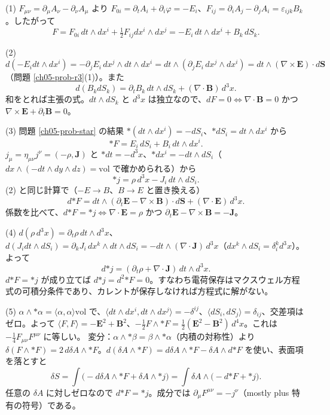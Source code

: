 \begin{solution}
(1) $F_{\mu\nu}=\partial_\mu A_\nu-\partial_\nu A_\mu$ より $F_{0i}=\partial_tA_i+\partial_i\varphi=-E_i$、$F_{ij}=\partial_iA_j-\partial_jA_i=\varepsilon_{ijk}B_k$。したがって
\[
F=F_{0i}\,dt\wedge dx^i+\tfrac12F_{ij}dx^i\wedge dx^j=-E_i\,dt\wedge dx^i+B_k\,dS_k .
\]

(2) $d(-E_idt\wedge dx^i)=-\partial_jE_i\,dx^j\wedge dt\wedge dx^i=dt\wedge(\partial_jE_i\,dx^j\wedge dx^i)=dt\wedge(\nabla\times\bm E)\cdot d\bm S$（問題 \ref{ch05-prob-r3}(1)）。また
\[
d(B_kdS_k)=\partial_tB_k\,dt\wedge dS_k+(\nabla\cdot\bm B)\,d^3x .
\]
和をとれば主張の式。$dt\wedge dS_k$ と $d^3x$ は独立なので、$dF=0\iff\nabla\cdot\bm B=0$ かつ $\nabla\times\bm E+\partial_t\bm B=0$。

(3) 問題 \ref{ch05-prob-star} の結果 ${*}(dt\wedge dx^i)=-dS_i$、${*}dS_i=dt\wedge dx^i$ から
\[
{*F}=E_i\,dS_i+B_i\,dt\wedge dx^i .
\]
$j_\mu=\eta_{\mu\nu}j^\nu=(-\rho,\bm J)$ と ${*dt}=-d^3x$、${*}dx^i=-dt\wedge dS_i$（$dx\wedge(-dt\wedge dy\wedge dz)=\mathrm{vol}$ で確かめられる）から
\[
{*j}=\rho\,d^3x-J_i\,dt\wedge dS_i .
\]
(2) と同じ計算で（$-E\to B$、$B\to E$ と置き換える）
\[
d{*F}=dt\wedge(\partial_t\bm E-\nabla\times\bm B)\cdot d\bm S+(\nabla\cdot\bm E)\,d^3x .
\]
係数を比べて、$d{*F}={*j}\iff\nabla\cdot\bm E=\rho$ かつ $\partial_t\bm E-\nabla\times\bm B=-\bm J$。

(4) $d(\rho\,d^3x)=\partial_t\rho\,dt\wedge d^3x$、$d(J_idt\wedge dS_i)=\partial_kJ_i\,dx^k\wedge dt\wedge dS_i=-dt\wedge(\nabla\cdot\bm J)\,d^3x$（$dx^k\wedge dS_i=\delta^k_id^3x$）。よって
\[
d{*j}=(\partial_t\rho+\nabla\cdot\bm J)\,dt\wedge d^3x .
\]
$d{*F}={*j}$ が成り立てば $d{*j}=d^2{*F}=0$。すなわち電荷保存はマクスウェル方程式の可積分条件であり、カレントが保存しなければ方程式に解がない。

(5) $\alpha\wedge{*\alpha}=\langle\alpha,\alpha\rangle\mathrm{vol}$ で、$\langle dt\wedge dx^i,dt\wedge dx^j\rangle=-\delta^{ij}$、$\langle dS_i,dS_j\rangle=\delta_{ij}$、交差項はゼロ。よって $\langle F,F\rangle=-\bm E^2+\bm B^2$、$-\frac12F\wedge{*F}=\frac12(\bm E^2-\bm B^2)\,d^4x$。これは $-\frac14F_{\mu\nu}F^{\mu\nu}$ に等しい。
変分：$\alpha\wedge{*\beta}=\beta\wedge{*\alpha}$（内積の対称性）より $\delta(F\wedge{*F})=2\,d\delta A\wedge{*F}$。$d(\delta A\wedge{*F})=d\delta A\wedge{*F}-\delta A\wedge d{*F}$ を使い、表面項を落とすと
\[
\delta S=\int\bigl(-d\delta A\wedge{*F}+\delta A\wedge{*j}\bigr)=\int\delta A\wedge\bigl(-d{*F}+{*j}\bigr).
\]
任意の $\delta A$ に対しゼロなので $d{*F}={*j}$。成分では $\partial_\mu F^{\mu\nu}=-j^\nu$（mostly plus 特有の符号）である。
\end{solution}

